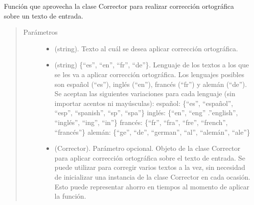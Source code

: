 \documentclass[letterpaper,10pt,openany,spanish]{sphinxmanual}
\begin{document}
\begin{fulllineitems}
\label{\detokenize{funciones/correccion:correccion.corregir_texto}}
Función que aprovecha la clase Corrector para realizar corrección         ortográfica sobre un texto de entrada.
\begin{quote}\begin{description}
\item[{Parámetros}] \leavevmode\begin{itemize}
\item {} 
 \textendash{} (string). Texto al cuál se desea aplicar corrección ortográfica.

\item {} 
 \textendash{} (string) \{“es”, “en”, “fr”, “de”\}. Lenguaje de los         textos a los que se les va a aplicar corrección ortográfica. Los lenguajes posibles son español         (“es”), inglés (“en”), francés (“fr”) y alemán (“de”). Se aceptan las         siguientes variaciones para cada lenguaje (sin importar acentos ni mayúsculas):                español: \{“es”, “español”, “esp”, “spanish”, “sp”, “spa”\} 
 inglés: \{“en”, “eng” .”english”, “inglés”, “ing”, “in”\} 
 francés: \{“fr”, “fra”, “fre”, “french”, “francés”\} 
 alemán: \{“ge”, “de”, “german”, “al”, “alemán”, “ale”\}   

\item {} 
 \textendash{} (Corrector). Parámetro opcional. Objeto de la clase Corrector para aplicar         corrección ortográfica sobre el texto de entrada. Se puede utilizar para         corregir varios textos a la vez, sin necesidad de inicializar una instancia de         la clase Corrector en cada ocasión. Esto puede representar ahorro en tiempos al         momento de aplicar la función.


\end{itemize}
\end{description}
\end{quote}
\end{fulllineitems}
\end{document}
